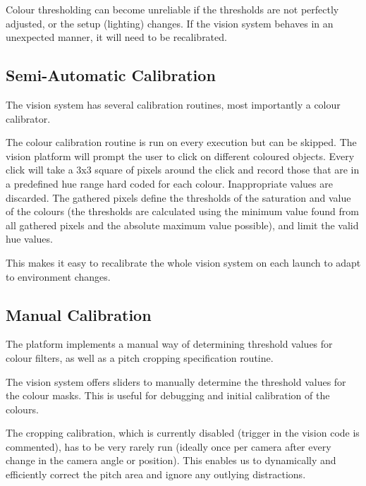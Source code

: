 Colour thresholding can become unreliable if the thresholds are not perfectly adjusted, or the setup (lighting) changes. If the vision system behaves in an unexpected manner, it will need to be recalibrated.


\subsection{Semi-Automatic Calibration}

The vision system has several calibration routines, most importantly a colour calibrator. 

The colour calibration routine is run on every execution but can be skipped. The vision platform will prompt the user to click on different coloured objects. Every click will take a 3x3 square of pixels around the click and record those that are in a predefined hue range hard coded for each colour. Inappropriate values are discarded. The gathered pixels define the thresholds of the saturation and value of the colours (the thresholds are calculated using the minimum value found from all gathered pixels and the absolute maximum value possible), and limit the valid hue values.

This makes it easy to recalibrate the whole vision system on each launch to adapt to environment changes.


\subsection{Manual Calibration}
The platform implements a manual way of determining threshold values for colour filters, as well as a pitch cropping specification routine.

The vision system offers sliders to manually determine the threshold values for the colour masks. This is useful for debugging and initial calibration of the colours.

The cropping calibration, which is currently disabled (trigger in the vision code is commented), has to be very rarely run (ideally once per camera after every change in the camera angle or position). This enables us to dynamically and efficiently correct the pitch area and ignore any outlying distractions.

